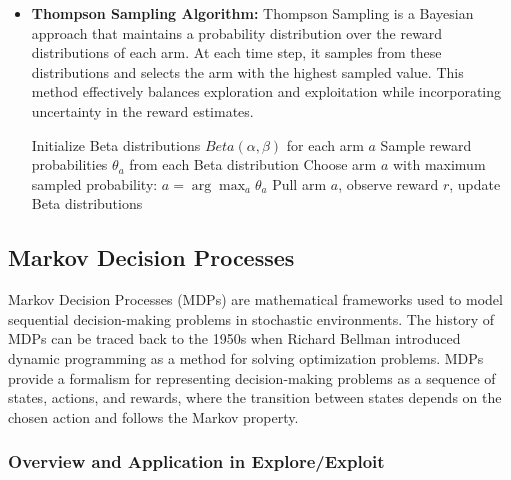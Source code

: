 \documentclass[12pt]{book} %
\begin{document}
\begin{itemize}
    \item \textbf{Thompson Sampling Algorithm:} Thompson Sampling is a Bayesian approach that maintains a probability distribution over the reward distributions of each arm. At each time step, it samples from these distributions and selects the arm with the highest sampled value. This method effectively balances exploration and exploitation while incorporating uncertainty in the reward estimates.
    \FloatBarrier
\begin{algorithm}
\caption{Thompson Sampling Algorithm}
\begin{algorithmic}[1]
    \State Initialize Beta distributions $Beta(\alpha, \beta)$ for each arm $a$
        \State Sample reward probabilities $\theta_a$ from each Beta distribution
        \State Choose arm $a$ with maximum sampled probability: $a = \arg\max_a \theta_a$
        \State Pull arm $a$, observe reward $r$, update Beta distributions
    \EndFor
\EndProcedure
\end{algorithmic}
\end{algorithm}
\FloatBarrier
\end{itemize}

\subsection{Markov Decision Processes}

Markov Decision Processes (MDPs) are mathematical frameworks used to model sequential decision-making problems in stochastic environments. The history of MDPs can be traced back to the 1950s when Richard Bellman introduced dynamic programming as a method for solving optimization problems. MDPs provide a formalism for representing decision-making problems as a sequence of states, actions, and rewards, where the transition between states depends on the chosen action and follows the Markov property.

\subsubsection{Overview and Application in Explore/Exploit}
\end{document}
